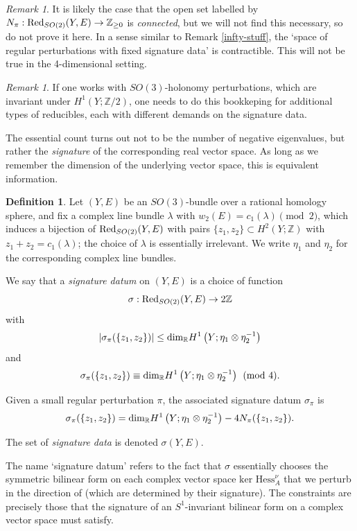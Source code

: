 \documentclass[10pt,a4paper]{amsart}
\theoremstyle{definition}
\newtheorem{definition}[theorem]{Definition}
\theoremstyle{remark}
\newtheorem{remark}[theorem]{Remark}
\numberwithin{figure}{qchap}
\begin{document}
\begin{remark}It is likely the case that the open set labelled by $N_\pi: \textup{Red}_{SO(2)}(Y,E) \to \mathbb Z_{\geq 0}$ is \textit{connected}, but we will not find this necessary, so do not prove it here. In a sense similar to Remark \ref{infty-stuff}, the `space of regular perturbations with fixed signature data' is contractible. This will not be true in the 4-dimensional setting.
\end{remark}

\begin{remark}If one works with $SO(3)$-holonomy perturbations, which are invariant under $H^1(Y;\mathbb Z/2)$, one needs to do this bookkeping for additional types of reducibles, each with different demands on the signature data.
\end{remark}

The essential count turns out not to be the number of negative eigenvalues, but rather the \emph{signature} of the corresponding real vector space. As long as we remember the dimension of the underlying vector space, this is equivalent information.

\begin{definition}\label{sigdata}Let $(Y, E)$ be an $SO(3)$-bundle over a rational homology sphere, and fix a complex line bundle $\lambda$ with $w_2(E) = c_1(\lambda) \pmod 2$, which induces a bijection of $\textup{Red}_{SO(2)}(Y,E)$ with pairs $\{z_1, z_2 \}\subset H^2(Y; \mathbb Z)$ with $z_1 + z_2 = c_1(\lambda)$; the choice of $\lambda$ is essentially irrelevant. We write $\eta_1$ and $\eta_2$ for the corresponding complex line bundles.

We say that a \textit{signature datum} on $(Y, E)$ is a choice of function 
$$\sigma: \textup{Red}_{SO(2)}(Y,E) \to 2\mathbb Z$$ 
with 
$$|\sigma_\pi(\{z_1, z_2\})| \leq \textup{dim}_{\mathbb R} H^1\left(Y; \eta_1 \otimes \eta_2^{-1}\right)$$ 
and 
$$\sigma_\pi(\{z_1, z_2\}) \equiv \textup{dim}_{\mathbb R} H^1\left(Y; \eta_1 \otimes \eta_2^{-1}\right) \pmod 4.$$

Given a small regular perturbation $\pi$, the associated signature datum $\sigma_\pi$ is 
$$\sigma_\pi(\{z_1, z_2\}) = \textup{dim}_{\mathbb R} H^1\left(Y; \eta_1 \otimes \eta_2^{-1}\right) - 4N_\pi(\{z_1, z_2\}).$$

The set of \textit{signature data} is denoted $\sigma(Y, E)$.
\end{definition}

The name `signature datum' refers to the fact that $\sigma$ essentially chooses the symmetric bilinear form on each complex vector space $\text{ker } \text{Hess}^\nu_A$ that we perturb in the direction of (which are determined by their signature). The constraints are precisely those that the signature of an $S^1$-invariant bilinear form on a complex vector space must satisfy.
\end{document}
